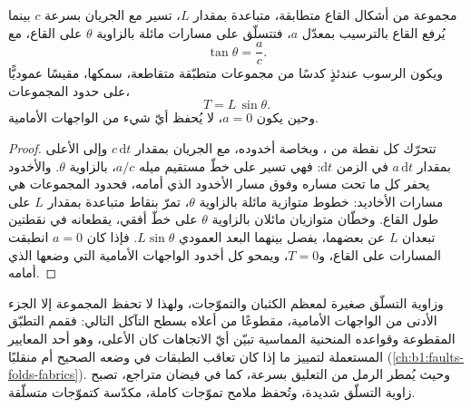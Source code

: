 \begin{proposition}\label{prop:b1:clastic-sediments:climb}
مجموعة من أشكال القاع متطابقة، متباعدة بمقدار $L$، تسير مع الجريان بسرعة $c$ بينما يُرفع القاع بالترسيب بمعدّل $a$، فتتسلّق على مسارات مائلة بالزاوية $\theta$ على القاع، مع
\[
  \tan\theta = \frac{a}{c}.
\]
ويكون الرسوب عندئذٍ كدسًا من مجموعات متطبّقة متقاطعة، سمكها، مقيسًا عموديًّا على حدود المجموعات،
\[
  T = L\,\sin\theta .
\]
وحين يكون $a = 0$، لا يُحفظ أيّ شيء من الواجهات الأمامية.
\end{proposition}

\begin{proof}
تتحرّك كل نقطة من ، وبخاصة أخدوده، مع الجريان بمقدار $c\,\mathrm dt$ وإلى الأعلى بمقدار $a\,\mathrm dt$ في الزمن $\mathrm dt$: فهي تسير على خطّ مستقيم ميله $a/c$، بالزاوية $\theta$. والأخدود يحفر كل ما تحت مساره وفوق مسار الأخدود الذي أمامه، فحدود المجموعات هي مسارات الأخاديد: خطوط متوازية مائلة بالزاوية $\theta$، تمرّ بنقاط متباعدة بمقدار $L$ على طول القاع. وخطّان متوازيان مائلان بالزاوية $\theta$ على خطّ أفقي، يقطعانه في نقطتين تبعدان $L$ عن بعضهما، يفصل بينهما البعد العمودي $L\sin\theta$. فإذا كان $a = 0$ انطبقت المسارات على القاع، و$T = 0$، ويمحو كل أخدود الواجهات الأمامية التي وضعها  الذي أمامه.
\end{proof}

وزاوية التسلّق صغيرة لمعظم الكثبان والتموّجات، ولهذا لا تحفظ المجموعة إلا الجزء الأدنى من الواجهات الأمامية، مقطوعًا من أعلاه بسطح التآكل التالي: فقمم التطبّق المقطوعة وقواعده المنحنية المماسية تبيّن أيّ الاتجاهات كان الأعلى، وهو أحد المعايير المستعملة لتمييز ما إذا كان تعاقب الطبقات في وضعه الصحيح أم منقلبًا (\cref{ch:b1:faults-folds-fabrics}). وحيث يُمطر الرمل من التعليق بسرعة، كما في فيضان متراجع، تصبح زاوية التسلّق شديدة، وتُحفظ ملامح تموّجات كاملة، مكدّسة كتموّجات متسلّقة.

